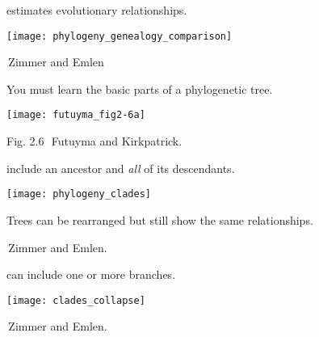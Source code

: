 \documentclass[t]{beamer}
\begin{document}

{
\begin{frame}[t]
\end{frame}
}


\begin{frame}[t,plain]{ estimates evolutionary relationships.}
	
	\vspace{-0.75\baselineskip}
	
	\texttt{[image: phylogeny\_genealogy\_comparison]}
	
	\vfilll
	\tiny \hfill \textcopyright\,Zimmer and Emlen
	
\end{frame}

\begin{frame}[t,plain]{You must learn the basic parts of a phylogenetic tree.}
	
	\centering
	
	\texttt{[image: futuyma\_fig2-6a]}
	
	\vfilll
	
	\tiny \hfill Fig. 2.6~\textcopyright\,Futuyma and Kirkpatrick.
	
\end{frame}

\begin{frame}[t,plain]{ include an ancestor and \emph{all} of its descendants.}
	
	\centering
	\vspace{-0.5\baselineskip}
	
	\texttt{[image: phylogeny\_clades]}
	
	\hangpara Trees can be rearranged but still show the same relationships.
	
	\vfilll
	\tiny \hfill \textcopyright\,Zimmer and Emlen.
\end{frame}

\begin{frame}[t,plain]{ can include one or more branches.}
	
	\centering
	\vspace{-0.5\baselineskip}
	
	\texttt{[image: clades\_collapse]}
	
	\vfilll
	\tiny \hfill \textcopyright\,Zimmer and Emlen.
\end{frame}
\end{document}
